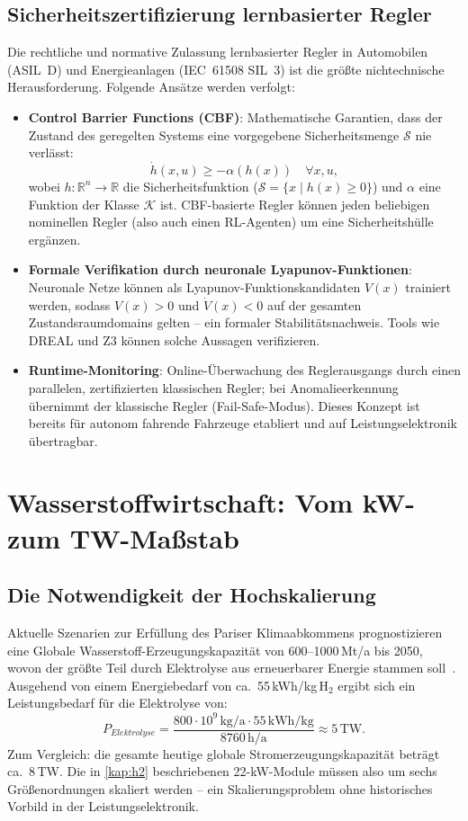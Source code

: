 ﻿\documentclass[a4paper,12pt,openany,oneside]{book}
\newcommand{\abschnitt}[1]{\section{#1}}
\newcommand{\unterabschnitt}[1]{\subsection{#1}}
\theoremstyle{definition}
\begin{document}
\unterabschnitt{Sicherheitszertifizierung lernbasierter Regler}

Die rechtliche und normative Zulassung lernbasierter Regler in Automobilen (ASIL~D)
und Energieanlagen (IEC~61508 SIL~3) ist die gr\"o\ss{}te nichtechnische Herausforderung.
Folgende Ans\"atze werden verfolgt:

\begin{itemize}
  \item \textbf{Control Barrier Functions (CBF)}: Mathematische Garantien, dass der
    Zustand des geregelten Systems eine vorgegebene Sicherheitsmenge $\mathcal{S}$
    nie verl\"asst:
    \[
      \dot{h}(x, u) \geq -\alpha(h(x)) \quad \forall x, u,
    \]
    wobei $h : \mathbb{R}^n \to \mathbb{R}$ die Sicherheitsfunktion ($\mathcal{S} = \{x \mid h(x) \geq 0\}$)
    und $\alpha$ eine Funktion der Klasse $\mathcal{K}$ ist. CBF-basierte Regler k\"onnen
    jeden beliebigen nominellen Regler (also auch einen RL-Agenten) um eine Sicherheitsh\"ulle
    erg\"anzen.
  \item \textbf{Formale Verifikation durch neuronale Lyapunov-Funktionen}: Neuronale Netze
    k\"onnen als Lyapunov-Funktionskandidaten $V(x)$ trainiert werden, sodass
    $V(x) > 0$ und $\dot{V}(x) < 0$ auf der gesamten Zustandsraumdomains gelten -- ein
    formaler Stabili\-t\"ats\-nachweis. Tools wie DREAL und Z3 k\"onnen solche Aussagen
    verifizieren.
  \item \textbf{Runtime-Monitoring}: Online-\"Uberwachung des Reglerausgangs durch einen
    parallelen, zertifizierten klassischen Regler; bei Anomalieerkennung \"ubernimmt der
    klassische Regler (Fail-Safe-Modus). Dieses Konzept ist bereits f\"ur autonom fahrende
    Fahrzeuge etabliert und auf Leistungselektronik \"ubertragbar.
\end{itemize}

\abschnitt{Wasserstoffwirtschaft: Vom kW- zum TW-Ma\ss{}stab}

\unterabschnitt{Die Notwendigkeit der Hochskalierung}

Aktuelle Szenarien zur Erf\"ullung des Pariser Klimaabkommens prognostizieren eine
Glo\-bale Wasserstoff-Erzeugungskapazit\"at von 600--1000\,Mt/a bis 2050, wovon der
gr\"o\ss{}te Teil durch Elektrolyse aus erneuerbarer Energie stammen soll~\cite{IEA2023}.
Ausgehend von einem Energiebedarf von ca.\ 55\,kWh/kg\,H$_2$ ergibt sich ein Leistungsbedarf
f\"ur die Elektrolyse von:
\[
  P_{Elektrolyse} = \frac{800 \cdot 10^9\,\mathrm{kg/a} \cdot 55\,\mathrm{kWh/kg}}
  {8760\,\mathrm{h/a}} \approx 5\,\mathrm{TW}.
\]
Zum Vergleich: die gesamte heutige globale Stromerzeugungskapazit\"at betr\"agt ca.\ 8\,TW.
Die in \autoref{kap:h2} beschriebenen 22-kW-Module m\"ussen also um sechs Gr\"o\ss{}enordnungen
skaliert werden -- ein Skalierungsproblem ohne historisches Vorbild in der Leistungselektronik.
\end{document}
